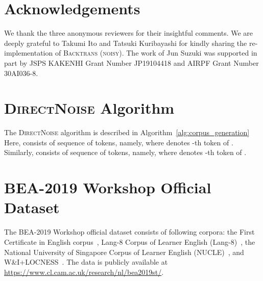 \documentclass[11pt,a4paper]{article}
\newcommand{\backtrans}{\textsc{Backtrans (noisy)}}
\newcommand{\directnoise}{\textsc{DirectNoise}}
\newcommand{\pseudodata}{\ensuremath{\mathcal{D}_{p}}}
\begin{document}
\section*{Acknowledgements}
We thank the three anonymous reviewers for their insightful comments.
We are deeply grateful to Takumi Ito and Tatsuki Kuribayashi for kindly sharing the re-implementation of \backtrans{}.
The work of Jun Suzuki was supported in part by JSPS KAKENHI Grant Number JP19104418 and AIRPF Grant Number 30AI036-8.




\newpage
\onecolumn
\appendix
\section{\directnoise{} Algorithm}
\label{appendix:algorithm}

The \directnoise{} algorithm is described in Algorithm~\ref{alg:corpus_generation}
Here,  consists of sequence of  tokens, namely,  where  denotes -th token of .
Similarly,  consists of sequence of  tokens, namely,  where  denotes -th token of .

\begin{algorithm}[h!]
  \small
  \DontPrintSemicolon
  \KwResult{Pseudo Corpus \pseudodata{}}
    \;
	\caption{\directnoise{} Algorithm}
  \label{alg:corpus_generation}
\end{algorithm}

\newpage
\section{BEA-2019 Workshop Official Dataset}
\label{appendix:bea-2019-dataset}
The BEA-2019 Workshop official dataset consists of following corpora: the First Certificate in English corpus~\citep{Yannakoudakis:11:ACL}, Lang-8 Corpus of Learner English (Lang-8)~\citep{mizumoto:2011:IJCNLP,Tajiri:12:ACL}, the National University of Singapore Corpus of Learner English (NUCLE)~\citep{Dahlmeier:13:BEA}, and W\&I+LOCNESS~\citep{Yannakoudakis:18:Journal,granger:1998:LEC}. 
The data is publicly available at \url{https://www.cl.cam.ac.uk/research/nl/bea2019st/}.
\end{document}
